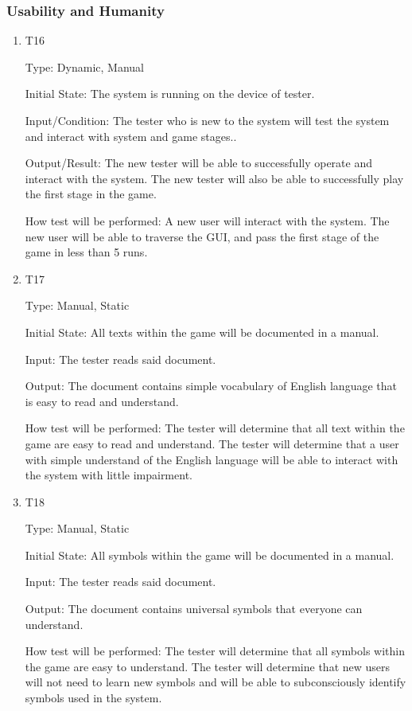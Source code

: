 \documentclass[12pt, titlepage]{article}
\begin{document}
\subsubsection{Usability and Humanity}

\begin{enumerate}

\item{T16}

Type: Dynamic, Manual

Initial State: The system is running on the device of tester.

Input/Condition: The tester who is new to the system will test the system and interact with system and game stages..

Output/Result: The new tester will be able to successfully operate and interact with the system. The new tester will also be able to successfully play the first stage in the game.

How test will be performed: A new user will interact with the system. The new user will be able to traverse the GUI, and pass the first stage of the game in less than 5 runs.

\item{T17}

Type: Manual, Static

Initial State: All texts within the game will be documented in a manual.

Input: The tester reads said document.

Output: The document contains simple vocabulary of English language that is easy to read and understand.

How test will be performed: The tester will determine that all text within the game are easy to read and understand. The tester will determine that a user with simple understand of the English language will be able to interact with the system with little impairment.

\item{T18}

Type: Manual, Static

Initial State: All symbols within the game will be documented in a manual.

Input: The tester reads said document.

Output: The document contains universal symbols that everyone can understand.

How test will be performed: The tester will determine that all symbols within the game are easy to understand. The tester will determine that new users will not need to learn new symbols and will be able to subconsciously identify symbols used in the system.

\end{enumerate}
\end{document}
